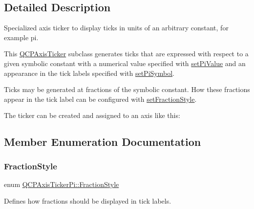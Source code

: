 \subsection{Detailed Description}
Specialized axis ticker to display ticks in units of an arbitrary constant, for example pi. 



This \hyperlink{class_q_c_p_axis_ticker}{Q\+C\+P\+Axis\+Ticker} subclass generates ticks that are expressed with respect to a given symbolic constant with a numerical value specified with \hyperlink{class_q_c_p_axis_ticker_pi_a36ce0651d2ec92edd36feac1619c2468}{set\+Pi\+Value} and an appearance in the tick labels specified with \hyperlink{class_q_c_p_axis_ticker_pi_acfdcd4758a393bde4be12a50fb2017b5}{set\+Pi\+Symbol}.

Ticks may be generated at fractions of the symbolic constant. How these fractions appear in the tick label can be configured with \hyperlink{class_q_c_p_axis_ticker_pi_a760c8af6ca68178e607556c4e5049d71}{set\+Fraction\+Style}.

The ticker can be created and assigned to an axis like this\+: 
\begin{DoxyCodeInclude}
\end{DoxyCodeInclude}


\subsection{Member Enumeration Documentation}
\mbox{\label{class_q_c_p_axis_ticker_pi_a262f1534c7f0c79a7d5237f5d1e2c54c}} 
\subsubsection{\texorpdfstring{Fraction\+Style}{FractionStyle}}
{\footnotesize\ttfamily enum \hyperlink{class_q_c_p_axis_ticker_pi_a262f1534c7f0c79a7d5237f5d1e2c54c}{Q\+C\+P\+Axis\+Ticker\+Pi\+::\+Fraction\+Style}}

Defines how fractions should be displayed in tick labels.

